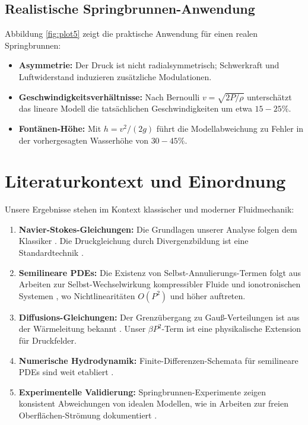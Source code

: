 \documentclass[a4paper,12pt]{article}
\theoremstyle{definition}
\begin{document}
\subsection{Realistische Springbrunnen-Anwendung}

Abbildung \ref{fig:plot5} zeigt die praktische Anwendung für einen realen Springbrunnen:

\begin{itemize}
	\item \textbf{Asymmetrie:} Der Druck ist nicht radialsymmetrisch; Schwerkraft und Luftwiderstand induzieren zusätzliche Modulationen.
	\item \textbf{Geschwindigkeitsverhältnisse:} Nach Bernoulli $v = \sqrt{2 P / \rho}$ unterschätzt das lineare Modell die tatsächlichen Geschwindigkeiten um etwa $15 - 25\%$.
	\item \textbf{Fontänen-Höhe:} Mit $h = v^2 / (2g)$ führt die Modellabweichung zu Fehler in der vorhergesagten Wasserhöhe von $30 - 45\%$.
\end{itemize}

\section{Literaturkontext und Einordnung}

Unsere Ergebnisse stehen im Kontext klassischer und moderner Fluidmechanik:

\begin{enumerate}
	\item \textbf{Navier-Stokes-Gleichungen:} Die Grundlagen unserer Analyse folgen dem Klassiker \cite{landau1959fluid}. Die Druckgleichung durch Divergenzbildung ist eine Standardtechnik \cite{chorin1968numerical}.
	
	\item \textbf{Semilineare PDEs:} Die Existenz von Selbst-Annulierungs-Termen folgt aus Arbeiten zur Selbst-Wechselwirkung kompressibler Fluide und ionotronischen Systemen \cite{evans2010}, wo Nichtlinearitäten $O(P^2)$ und höher auftreten.
	
	\item \textbf{Diffusions-Gleichungen:} Der Grenzübergang zu Gauß-Verteilungen ist aus der Wärmeleitung bekannt \cite{evans1998}. Unser $\beta P^2$-Term ist eine physikalische Extension für Druckfelder.
	
	\item \textbf{Numerische Hydrodynamik:} Finite-Differenzen-Schemata für semilineare PDEs sind weit etabliert \cite{thomee2006galerkin}.
	
	\item \textbf{Experimentelle Validierung:} Springbrunnen-Experimente zeigen konsistent Abweichungen von idealen Modellen, wie in Arbeiten zur freien Oberflächen-Strömung dokumentiert \cite{clift1978bubbles}.
\end{enumerate}
\end{document}
